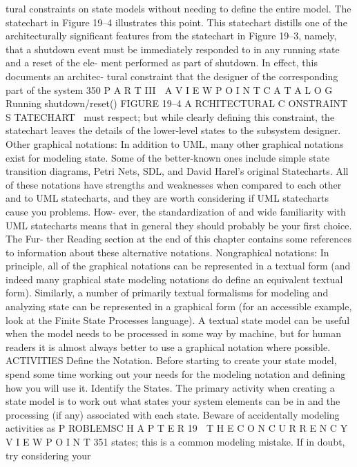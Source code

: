 tural constraints on state models without needing to define the entire
model. The statechart in Figure 19–4 illustrates this point.
This statechart distills one of the architecturally significant features
from the statechart in Figure 19–3, namely, that a shutdown event must
be immediately responded to in any running state and a reset of the ele-
ment performed as part of shutdown. In effect, this documents an architec-
tural constraint that the designer of the corresponding part of the system
350
 P A R T III  A V I E W P O I N T C A T A L O G
Running
shutdown/reset()
FIGURE 19–4 A RCHITECTURAL C ONSTRAINT S TATECHART
must respect; but while clearly defining this constraint, the statechart
leaves the details of the lower-level states to the subsystem designer.
Other graphical notations: In addition to UML, many other graphical
notations exist for modeling state. Some of the better-known ones
include simple state transition diagrams, Petri Nets, SDL, and David
Harel’s original Statecharts. All of these notations have strengths and
weaknesses when compared to each other and to UML statecharts, and
they are worth considering if UML statecharts cause you problems. How-
ever, the standardization of and wide familiarity with UML statecharts
means that in general they should probably be your first choice. The Fur-
ther Reading section at the end of this chapter contains some references
to information about these alternative notations.
Nongraphical notations: In principle, all of the graphical notations can be
represented in a textual form (and indeed many graphical state modeling
notations do define an equivalent textual form). Similarly, a number of
primarily textual formalisms for modeling and analyzing state can be
represented in a graphical form (for an accessible example, look at the
Finite State Processes language). A textual state model can be useful
when the model needs to be processed in some way by machine, but for
human readers it is almost always better to use a graphical notation
where possible.
ACTIVITIES
Define the Notation. Before starting to create your state model, spend some
time working out your needs for the modeling notation and defining how you
will use it.
Identify the States. The primary activity when creating a state model is to
work out what states your system elements can be in and the processing (if
any) associated with each state. Beware of accidentally modeling activities as
P ROBLEMSC H A P T E R 19  T H E C O N C U R R E N C Y V I E W P O I N T
 351
states; this is a common modeling mistake. If in doubt, try considering your
